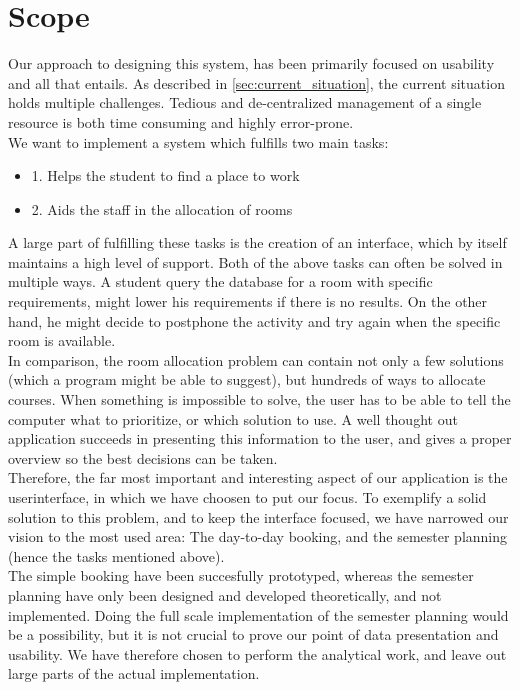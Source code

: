 \label{sec:scope}
\section{Scope}
Our approach to designing this system, has been primarily focused on usability and all that entails. As described in \ref{sec:current_situation}, the current situation holds multiple challenges. Tedious and de-centralized management of a single resource is both time consuming and highly error-prone.\\
We want to implement a system which fulfills two main tasks:
\begin{itemize}
	\item 1. Helps the student to find a place to work
	\item 2. Aids the staff in the allocation of rooms
\end{itemize}
A large part of fulfilling these tasks is the creation of an interface, which by itself maintains a high level of support. 
Both of the above tasks can often be solved in multiple ways. A student query the database for a room with specific requirements, might lower his requirements if there is no results. On the other hand, he might decide to postphone  the activity and try again when the specific room is available.\\
In comparison, the room allocation problem can contain not only a few solutions (which a program might be able to suggest), but hundreds of ways to allocate courses. When something is impossible to solve, the user has to be able to tell the computer what to prioritize, or which solution to use.
A well thought out application succeeds in presenting this information to the user, and gives a proper overview so the best decisions can be taken. \\
Therefore, the far most important and interesting aspect of our application is the userinterface, in which we have choosen to put our focus. To exemplify a solid solution to this problem, and to keep the interface focused, we have narrowed our vision to the most used area: The day-to-day booking, and the semester planning (hence the tasks mentioned above). \\

The simple booking have been succesfully prototyped, whereas the semester planning have only been designed and developed theoretically, and not implemented. Doing the full scale implementation of the semester planning would be a possibility, but it is not crucial to prove our point of data presentation and usability. We have therefore chosen to perform the analytical work, and leave out large parts of the actual implementation.

